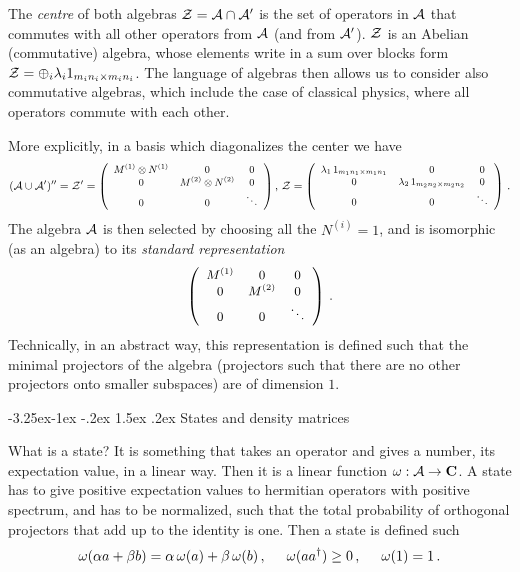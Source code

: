 \documentclass[11pt,a4paper]{article}
\makeatletter
\renewcommand\subsection{\@startsection{subsection}{2}{\z@}%
                                   {-3.25ex\@plus -1ex \@minus -.2ex}%
                                     {1.5ex \@plus .2ex}%
                                     {\normalfont\bfseries}}
\numberwithin{equation}{section}
\newcommand{\be}{\begin{equation}}
\newcommand{\ee}{\end{equation}}
\makeatother
\begin{document}
The {\sl centre} of both algebras ${\cal Z}={\cal A}\cap {\cal A}'$ is the set of operators in ${\cal A}$ that commutes with all other operators from ${\cal A}$ (and from ${\cal A}'$). ${\cal Z}$ is an Abelian (commutative) algebra, whose elements write in a sum over blocks form ${\cal Z}=\oplus_i \lambda_i 1_{m_i n_i\times m_i n_i}$. The language of algebras then allows us to consider also commutative algebras, which include the case of classical physics, where all operators commute with each other.

More explicitly, in  a basis which diagonalizes the center we have
\begin{equation}
\small \small\small
({\cal A}\cup {\cal A}')''={\cal Z}'=
\left(\begin{array}{ccc}
  M^{(1)}\otimes N^{(1)} & 0 & 0\\
  0 & M^{(2)}\otimes N^{(2)} & 0 \\
  0 & 0 & \ddots
\end{array}\right), \,  {\cal Z}=
\left(\begin{array}{ccc}
  \lambda_1\,1_{m_1 n_1\times m_1 n_1} & 0 & 0 \\
  0 & \lambda_2\, 1_{m_2 n_2\times m_2 n_2} &  0 \\
  0 & 0 & \ddots
\end{array}\right)\,.
\end{equation} 
The algebra ${\cal A}$ is then selected by choosing all the $N^{(i)}=1$, and is isomorphic (as an algebra) to its {\sl standard representation}
\begin{equation}\small
 \left(\begin{array}{ccc}
  M^{(1)} & 0 & 0 \\
  0 & M^{(2)} & 0\\
  0 & 0 & \ddots
\end{array}\right)\,.
\end{equation}
Technically, in an abstract way, this representation is defined such that the minimal projectors of the algebra (projectors such that there are no other projectors onto smaller subspaces) are of dimension $1$.  

\subsection{States and density matrices}

What is a state? It is something that takes an operator and gives a number, its expectation value, in a linear way. Then it is a linear function $\omega: {\cal A}\rightarrow {\mathbf{C}}$. A state has to give positive expectation values to hermitian operators with positive spectrum, and has to be normalized, such that the total probability of orthogonal projectors that add up to the identity is one. Then a state is defined such 
\be
\omega(\alpha a+ \beta b)=\alpha \,\omega(a)+\beta\, \omega(b)\,, \hspace{.5cm} \omega(a a^\dagger)\ge 0\,, \hspace{0.5cm} \omega(1)=1\,. 
\ee 
 
\end{document}
